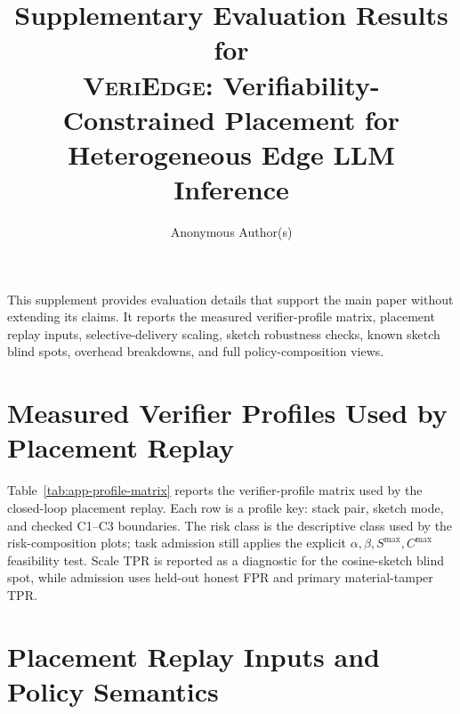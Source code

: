 \documentclass[sigplan,screen,review,anonymous]{acmart}
\newcommand{\system}{\textsc{VeriEdge}\xspace}
\begin{document}
\title[Supplementary Evaluation Results for VeriEdge]{Supplementary Evaluation Results for%
\texorpdfstring{\\}{ }%
\texorpdfstring{\system}{VeriEdge}: Verifiability-Constrained Placement for Heterogeneous Edge LLM Inference}

\author{Anonymous Author(s)}



\maketitle
\thispagestyle{empty}
\pagestyle{empty}
\raggedbottom

\label{app:eval-supplement}

This supplement provides evaluation details that support the main paper without
extending its claims. It reports the measured verifier-profile matrix,
placement replay inputs, selective-delivery scaling, sketch robustness checks,
known sketch blind spots, overhead breakdowns, and full policy-composition
views.

\section{Measured Verifier Profiles Used by Placement Replay}
\label{app:profile-matrix}

Table~\ref{tab:app-profile-matrix} reports the verifier-profile matrix used by
the closed-loop placement replay. Each row is a profile key: stack pair, sketch
mode, and checked C1--C3 boundaries. The risk class is the descriptive class
used by the risk-composition plots; task admission still applies the explicit
\(\alpha,\beta,S^{\max},C^{\max}\) feasibility test. Scale TPR is reported as a
diagnostic for the cosine-sketch blind spot, while admission uses held-out
honest FPR and primary material-tamper TPR.


\section{Placement Replay Inputs and Policy Semantics}
\label{app:placement-replay-config}
\end{document}
